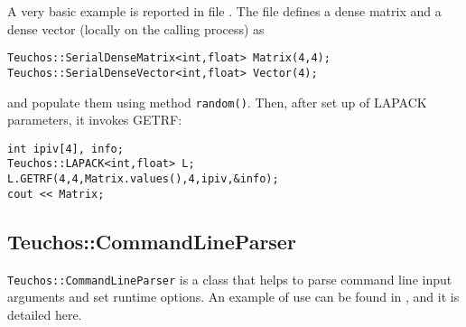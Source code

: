 A very basic example is reported in file . The
file defines a dense matrix and a dense vector (locally on the calling
process)  as
\begin{verbatim}
Teuchos::SerialDenseMatrix<int,float> Matrix(4,4);
Teuchos::SerialDenseVector<int,float> Vector(4);
\end{verbatim}
and populate them using method \verb!random()!. Then, after set up of
LAPACK parameters, it invokes GETRF:
\begin{verbatim}
int ipiv[4], info;
Teuchos::LAPACK<int,float> L;
L.GETRF(4,4,Matrix.values(),4,ipiv,&info); 
cout << Matrix;
\end{verbatim}


\subsection{Teuchos::CommandLineParser}
\label{sec:teuchos:CLP}

\verb!Teuchos::CommandLineParser! is a class that helps to parse command
line input arguments and set runtime options. An example of use can be
found in , and it is detailed here.

